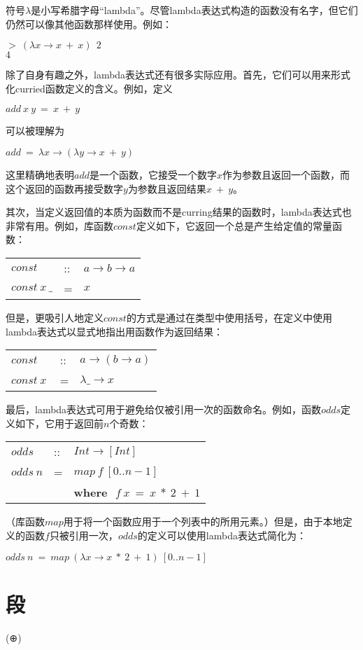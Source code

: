 符号$\lambda$是小写希腊字母“lambda”。尽管lambda表达式构造的函数没有名字，但它们仍然可以像其他函数那样使用。例如：

\noindent\hspace*{1cm} $>~(\lambda x \rightarrow x~+~x)~~2$\\
\hspace*{1cm} $4$

除了自身有趣之外，lambda表达式还有很多实际应用。首先，它们可以用来形式化curried函数定义的含义。例如，定义

\noindent\hspace*{1cm} $add~x~y~=~x~+~y$

可以被理解为

\noindent\hspace*{1cm} $add~=~\lambda x \rightarrow (\lambda y \rightarrow x~+~y)$

这里精确地表明$add$是一个函数，它接受一个数字$x$作为参数且返回一个函数，而这个返回的函数再接受数字$y$为参数且返回结果$x~+~y$。

其次，当定义返回值的本质为函数而不是curring结果的函数时，lambda表达式也非常有用。例如，库函数$const$定义如下，它返回一个总是产生给定值的常量函数：

\begin{tabular}[t]{lll}
$const$&::&$a \rightarrow b \rightarrow a$\\
$const~x~\_$&=&$x$\\
\end{tabular}

但是，更吸引人地定义$const$的方式是通过在类型中使用括号，在定义中使用lambda表达式以显式地指出用函数作为返回结果：

\begin{tabular}[t]{lll}
$const$&::&$a \rightarrow (b \rightarrow a)$\\
$const~x~$&=&$\lambda \_ \rightarrow x$\\
\end{tabular}

最后，lambda表达式可用于避免给仅被引用一次的函数命名。例如，函数$odds$定义如下，它用于返回前$n$个奇数：

\begin{tabular}[t]{lll}
$odds$&::&$Int \rightarrow [Int]$\\
$odds~n$&=&$map~f~[0..n-1]$\\
& &\textbf{where}~$~f~x~=~x~*~2~+~1$\\
\end{tabular}

（库函数$map$用于将一个函数应用于一个列表中的所用元素。）但是，由于本地定义的函数$f$只被引用一次，$odds$的定义可以使用lambda表达式简化为：

\noindent\hspace*{1cm} $odds~n~=~map~(\lambda x \rightarrow x~*~2~+~1)~[0..n-1]$

\section{段}

(⊕)

